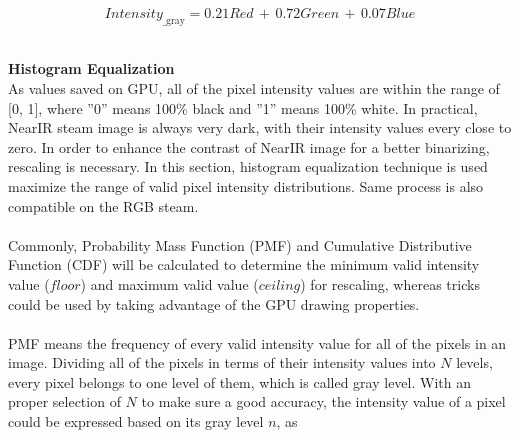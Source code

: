 \begin{equation}
%
Intensity_{\text{\_gray}} =  0.21 Red\,  + \, 0.72 Green \, + \, 0.07 Blue
%
\end{equation}%
%
\\\par%
 \qquad \textbf{Histogram Equalization}\\%
As values saved on GPU, all of the pixel intensity values are within the range of [0, 1], where ''0'' means 100\% black and ''1''  means 100\% white. In practical, NearIR steam image is always very dark, with their intensity values every close to zero.  In order to enhance the contrast of NearIR image for a better binarizing, rescaling is necessary. In this section, histogram equalization technique is used maximize the range of valid pixel intensity distributions. Same process is also compatible on the RGB steam.\\
\\%
Commonly, Probability Mass Function (PMF) and Cumulative Distributive Function (CDF) will be calculated to determine the minimum valid intensity value (\(floor\)) and maximum valid value (\(ceiling\)) for rescaling, whereas tricks could be used by taking advantage of the GPU drawing properties.\\%
\\%
PMF means the frequency of every valid intensity value for all of the pixels in an image. Dividing all of the pixels in terms of their intensity values into \(N\) levels, every pixel belongs to one level of them, which is called gray level. With an proper selection of \(N\) to make sure a good accuracy, the intensity value of a pixel could be expressed based on its gray level \(n\), as\par%

